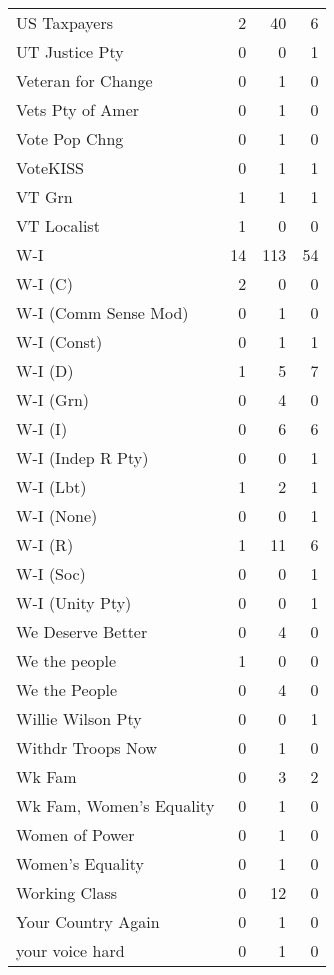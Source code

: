 \begin{supertabular}{lrrr}
US Taxpayers & 2 & 40 & 6\\
UT Justice Pty & 0 & 0 & 1\\
Veteran for Change & 0 & 1 & 0\\
Vets Pty of Amer & 0 & 1 & 0\\
Vote Pop Chng & 0 & 1 & 0\\
VoteKISS & 0 & 1 & 1\\
VT Grn & 1 & 1 & 1\\
VT Localist & 1 & 0 & 0\\
W-I & 14 & 113 & 54\\
W-I (C) & 2 & 0 & 0\\
W-I (Comm Sense Mod) & 0 & 1 & 0\\
W-I (Const) & 0 & 1 & 1\\
W-I (D) & 1 & 5 & 7\\
W-I (Grn) & 0 & 4 & 0\\
W-I (I) & 0 & 6 & 6\\
W-I (Indep R Pty) & 0 & 0 & 1\\
W-I (Lbt) & 1 & 2 & 1\\
W-I (None) & 0 & 0 & 1\\
W-I (R) & 1 & 11 & 6\\
W-I (Soc) & 0 & 0 & 1\\
W-I (Unity Pty) & 0 & 0 & 1\\
We Deserve Better & 0 & 4 & 0\\
We the people & 1 & 0 & 0\\
We the People & 0 & 4 & 0\\
Willie Wilson Pty & 0 & 0 & 1\\
Withdr Troops Now & 0 & 1 & 0\\
Wk Fam & 0 & 3 & 2\\
Wk Fam, Women's Equality & 0 & 1 & 0\\
Women of Power & 0 & 1 & 0\\
Women's Equality & 0 & 1 & 0\\
Working Class & 0 & 12 & 0\\
Your Country Again & 0 & 1 & 0\\
your voice hard & 0 & 1 & 0\\
\bottomrule
\end{supertabular}
